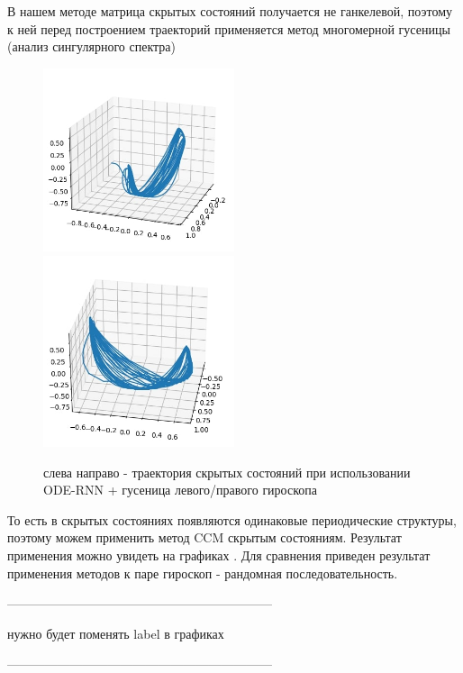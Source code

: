 \documentclass[12pt, twoside]{article}
\begin{document}
	В нашем методе матрица скрытых состояний получается не ганкелевой, поэтому к ней перед построением траекторий применяется метод многомерной гусеницы (анализ сингулярного спектра) \cite{SSA1997}


\begin{figure}
	\includegraphics[width = 0.5\textwidth]{images/trajectory_left.jpg} \hfill
	\includegraphics[width = 0.5\textwidth]{images/trajectory_right.jpg}
	\caption{слева направо - траектория скрытых состояний при использовании ODE-RNN + гусеница левого/правого гироскопа}
\end{figure}		
	
	То есть в скрытых состояниях появляются одинаковые периодические структуры, поэтому можем применить метод CCM  скрытым состояниям. Результат применения можно увидеть на графиках \label{CCM_apply}. Для сравнения приведен результат применения методов к паре гироскоп - рандомная последовательность.
	
---------------------------------------------------------------

нужно будет поменять label в графиках
	
---------------------------------------------------------------
\end{document}
